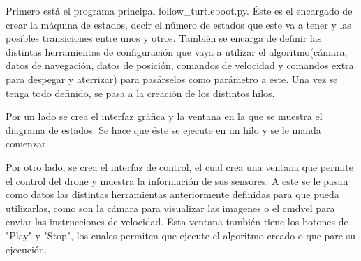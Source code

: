 \hspace{1 cm} Primero est\'a el programa principal follow\_turtleboot.py. \'Este es el encargado de crear la m\'aquina de estados, decir el n\'umero de estados que este va a tener y las posibles transiciones entre unos y otros. Tambi\'en se encarga de definir las distintas herramientas de configuraci\'on que vaya a utilizar el algoritmo(c\'amara, datos de navegaci\'on, datos de posici\'on, comandos de velocidad y comandos extra para despegar y aterrizar) para pas\'arselos como par\'ametro a este. Una vez se tenga todo definido, se pasa a la creaci\'on de los distintos hilos.

\hspace{1 cm} Por un lado se crea el interfaz gr\'afica y la ventana en la que se muestra el diagrama de estados. Se hace que \'este se ejecute en un hilo y se le manda comenzar.

\hspace{1 cm} Por otro lado, se crea el interfaz de control, el cual crea una ventana que permite el control del drone y muestra la informaci\'on de sus sensores. A este se le pasan como datos las distintas herramientas anteriormente definidas para que pueda utilizarlas, como son la c\'amara para visualizar las imagenes o el cmdvel para enviar las instrucciones de velocidad. Esta ventana tambi\'en tiene los botones de "Play" y "Stop", los cuales permiten que ejecute el algoritmo creado o que pare su ejecuci\'on.

